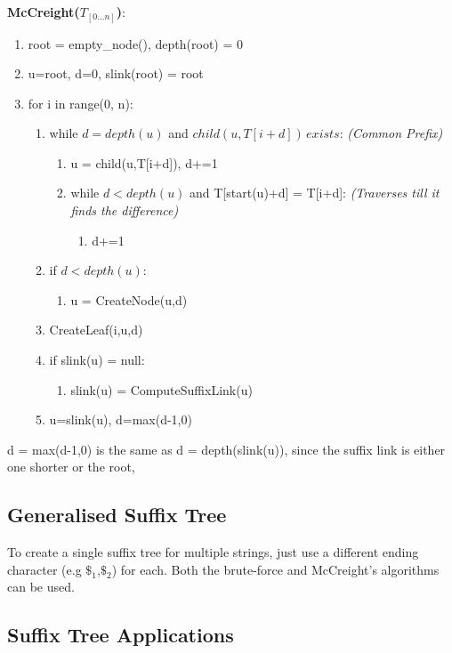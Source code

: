 \textbf{McCreight($T_{[0\dots n]}$)}:
\begin{enumerate}[label=\Alph*]
    \item root = empty\_node(), depth(root) = 0
    \item u=root, d=0, slink(root) = root
    \item for i in range(0, n):
\begin{enumerate}[label=\arabic*]
    \item while $d = depth(u)$ and $child(u,T[i+d])\, exists$: \emph{(Common Prefix)}
    \begin{enumerate}
        \item u = child(u,T[i+d]), d+=1
        \item while $d < depth(u)$ and T[start(u)+d] = T[i+d]: \emph{(Traverses till it finds the difference)}
        \begin{enumerate}
            \item [] d+=1
        \end{enumerate} 
    \end{enumerate}
    \item if $d < depth(u)$:
    \begin{enumerate}
        \item [] u = CreateNode(u,d)
    \end{enumerate}    
    \item CreateLeaf(i,u,d)
    \item if slink(u) =  null:
        \begin{enumerate}
        \item [] slink(u) = ComputeSuffixLink(u)
    \end{enumerate}  
    \item u=slink(u), d=max(d-1,0)
\end{enumerate}    
\end{enumerate}
d = max(d-1,0) is the same as d = depth(slink(u)), since the suffix link is either one shorter or the root, 

\subsection{Generalised Suffix Tree}
To create a single suffix tree for multiple strings, just use a different ending character (e.g $\$_1$,$\$_2$) for each. Both the brute-force and McCreight's algorithms can be used.

\subsection{Suffix Tree Applications}


